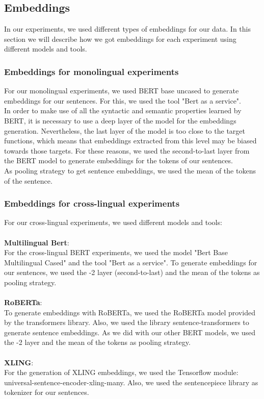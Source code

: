 \subsection{Embeddings}
In our experiments, we used different types of embeddings for our data. In this section we will describe how we got embeddings for each experiment using different models and tools.
\subsubsection{Embeddings for monolingual experiments}
For our monolingual experiments, we used BERT base uncased to generate embeddings for our sentences. For this, we used the tool "Bert as a service".\\
In order to make use of all the syntactic and semantic properties learned by BERT, it is necessary to use a deep layer of the model for the embeddings generation. Nevertheless, the last layer of the model is too close to the target functions, which means that embeddings extracted from this level may be biased towards those targets. For these reasons, we used the second-to-last layer from the BERT model to generate embeddings for the tokens of our sentences.\\
As pooling strategy to get sentence embeddings, we used the mean of the tokens of the sentence.
\subsubsection{Embeddings for cross-lingual experiments}
For our cross-lingual experiments, we used different models and tools:\\\\
{\bf Multilingual Bert}:\\
For the cross-lingual BERT experiments, we used the model "Bert Base Multilingual Cased" and the tool "Bert as a service". To generate embeddings for our sentences, we used the -2 layer (second-to-last) and the mean of the tokens as pooling strategy.\\\\
{\bf RoBERTa}:\\
To generate embeddings with RoBERTa, we used the RoBERTa  model provided by the transformers library. Also, we used the library sentence-transformers to generate sentence embeddings. As we did with our other BERT models, we used the -2 layer and the mean of the tokens as pooling strategy.\\\\
{\bf XLING}:\\
For the generation of XLING embeddings, we used the Tensorflow module: universal-sentence-encoder-xling-many. Also, we used the sentencepiece library as tokenizer for our sentences.
